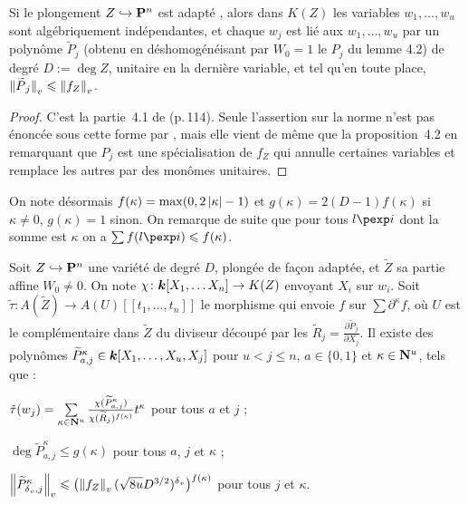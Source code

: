 \documentclass{mpg-preth}
\begin{document}
\begin{fact}
  Si le plongement $Z \hookrightarrow \mathbf{P}^n$ est \og adapté \fg{}, alors
  dans $K(Z)$ les variables $w_1, \ldots, w_u$ sont algébriquement
  indépendantes, et chaque $w_j$ est lié aux $w_1, \ldots, w_u$ par un
  polynôme $\widetilde P _j$ (obtenu en déshomogénéisant par $W_0 = 1$ le
  $P_j$ du lemme 4.2) de degré $D := \deg Z$, unitaire en la dernière
  variable, et tel qu'en toute place, $\left\lVert\smash{\widetilde P}_j\right\rVert_{v} \leqslant
  \left\lVert f_Z\right\rVert_{v}$.
\end{fact}

\begin{proof}
  C'est la partie~4.1 de  (p.\,114). Seule l'assertion sur la norme
  n'est pas énoncée sous cette forme par , mais elle vient de même
  que la proposition~4.2 en remarquant que $P_j$ est une spécialisation de $f_Z$
  qui annulle certaines variables et remplace les autres par des monômes
  unitaires.
\end{proof}

On note désormais $f(\kappa) = \max(0, 2\left\lvert\kappa\right\rvert - 1)$ et $g(\kappa) =
2(D-1)f(\kappa)$ si $\kappa \neq 0$, $g(\kappa) = 1$ sinon. On remarque de
suite que pour tous $l\pexp i$ dont la somme est $\kappa$ on a $\sum f(l\pexp i)
\le f(\kappa)$.

\begin{lem}
  Soit $Z \hookrightarrow \mathbf{P}^n$ une variété de degré $D$, plongée de façon
  adaptée, et $\widetilde Z$ sa partie affine $W_0 \neq 0$. On note $\chi \colon
  \boldsymbol{k}[X_1, \ldots X_n] \to K(Z)$ envoyant $X_i$ sur $w_i$.  Soit $\tilde\tau :
  A(\widetilde Z) \to A(U)[[t_1, \ldots, t_n]]$ le morphisme qui envoie $f$ sur
  $\sum\partial^\kappa f$, où $U$ est le complémentaire dans $\widetilde Z$ du
  diviseur découpé par les $\widetilde R_j = \frac{\partial \widetilde P _j}
  {\partial X_j}$. Il existe des polynômes $\widetilde P_{a, j}^\kappa \in
  \boldsymbol{k}[X_1, \ldots, X_u, X_j]$ pour $u < j \le n$, $a \in \{0, 1\}$ et $\kappa
  \in \mathbf{N}^u$, tels que :
  \begin{enumthm}
    \item $\tilde\tau(w_j) = \sum\limits_{\kappa\in\mathbf{N}^u}
      \frac{\chi(\widetilde P_{a, j}^\kappa)}{\chi(\widetilde
      R_j)^{f(\kappa)}} t^\kappa$ pour tous $a$ et $j$ ;
    \item $\deg \widetilde P_{a, j}^\kappa \le g(\kappa)$ pour tous $a$, $j$ et
      $\kappa$ ;
    \item $\left\lVert\widetilde P_{{\delta\smash{_v}}, j}^\kappa\right\rVert_{v} \leqslant \bigl( \left\lVert f_Z\right\rVert_{v} (\sqrt{8u}
      D^{3/2})^{\delta\smash{_v}} \bigr)^{f(\kappa)}$ pour tous $j$ et $\kappa$.
  \end{enumthm}
\end{lem}
\end{document}
